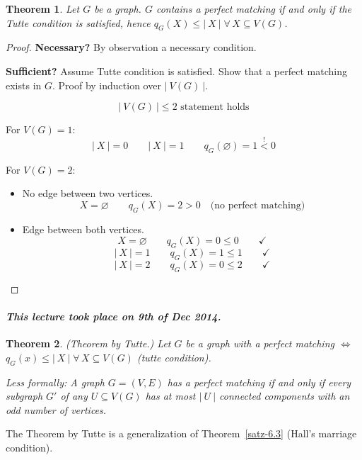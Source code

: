 \documentclass{article}
\newtheorem{theorem}{Theorem}
\newcommand{\card}[1]{\left|\:\!#1\:\!\right|}
\newcommand{\dateref}[1]{\paragraph{\textit{This lecture took place on #1.}}}
\newcommand{\fall}{\;\forall\,}
\begin{document}
\begin{theorem}\label{satz-6.6}
  Let $G$ be a graph. $G$ contains a perfect matching if and only if the Tutte condition is satisfied,
  hence $q_G(X) \leq \card{X} \fall X \subseteq V(G)$.
\end{theorem}

\begin{proof}
  \textbf{Necessary?} By observation a necessary condition.

  \textbf{Sufficient?} Assume Tutte condition is satisfied. Show that a perfect matching exists in $G$.
  Proof by induction over $\card{V(G)}$.

  \[ \card{V(G)} \leq 2 \text{ statement holds} \]

  For $V(G) = 1$:
  \[  \card{X} = 0 \qquad \card{X} = 1 \qquad q_G(\diameter) = 1 \stackrel{!}{<} 0 \]

  For $V(G) = 2$:
  \begin{itemize}
    \item No edge between two vertices.
      \[ X = \diameter \qquad q_G(X) = 2 > 0 \quad \text{(no perfect matching)} \]
    \item Edge between both vertices.
      \[ X = \diameter \qquad q_G(X) = 0 \leq 0 \qquad \checkmark \]
      \[ \card{X} = 1 \qquad q_G(X) = 1 \leq 1 \qquad \checkmark \]
      \[ \card{X} = 2 \qquad q_G(X) = 0 \leq 2 \qquad \checkmark \]
  \end{itemize}
\end{proof}

\dateref{9th of Dec 2014}

\begin{theorem}
  (Theorem by Tutte.)
  Let $G$ be a graph with a perfect matching
  $\Leftrightarrow$ $q_G(x) \leq \card{X} \fall X \subseteq V(G)$ (tutte condition).

  Less formally:
  A graph $G = (V, E)$ has a perfect matching if and only if every subgraph $G'$
  of any $U \subseteq V(G)$ has at most $\card{U}$ connected components
  with an odd number of vertices.
\end{theorem}

The Theorem by Tutte is a generalization of Theorem~\ref{satz-6.3} (Hall's marriage condition).
\end{document}
